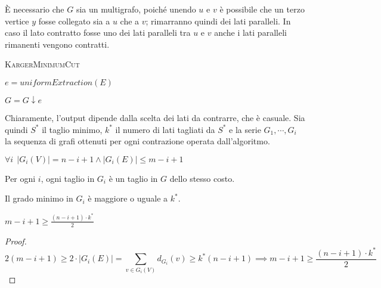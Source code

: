 \`E necessario che $G$ sia
un multigrafo, poiché unendo $u$ e $v$ è possibile che un terzo vertice $y$
fosse collegato sia a $u$ che a $v$; rimarranno quindi dei lati paralleli.
In caso il lato contratto fosse uno dei lati paralleli tra $u$ e $v$ anche
i lati paralleli rimanenti vengono contratti.

\begin{algorithm}[h]
	\caption{\textsc{KargerMinimumCut}}
	\label{algo:Karger}

	{
	}
	{
		$e = uniformExtraction(E)$

		$G = G\downarrow e$

	}


\end{algorithm}

Chiaramente, l'output dipende dalla scelta dei lati da contrarre, che è casuale.
Sia quindi $S^*$ il taglio minimo, $k^*$ il numero di lati tagliati da $S^*$ e
la serie $G_1, \cdots, G_i$ la sequenza di grafi ottenuti per ogni contrazione
operata dall'algoritmo.
\begin{oss}\label{oss:kargercontraction}
	$\forall i ~~ |G_i(V)| = n - i + 1 \land |G_i(E)| \leq m - i + 1$
\end{oss}
\begin{oss}\label{oss:kargercuts}
	Per ogni $i$, ogni taglio in $G_i$ è un taglio in $G$ dello stesso costo.
\end{oss}
\begin{oss}\label{oss:kargermindeg}
	Il grado minimo in $G_i$ è maggiore o uguale a $k^*$.
\end{oss}

\begin{lemma}\label{lem:kargeredges}
	$m - i  +1 \geq \frac{(n - i + 1) \cdot k^*}{2}$
\end{lemma}
\begin{proof}
$$
	2(m - i +1) \geq 2 \cdot |G_i(E)| = \sum_{v \in G_i(V)} d_{G_i}(v) \geq k^* (n - i + 1) \implies m - i  +1 \geq \frac{(n - i + 1) \cdot k^*}{2}
$$
\end{proof}

